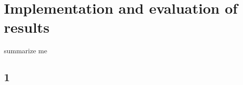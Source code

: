 \chapter{Implementation and evaluation of results}
\label{sec:implementation}

\begin{summary}
summarize me
\end{summary}

\section{1}
\label{sec:implementation:1}
